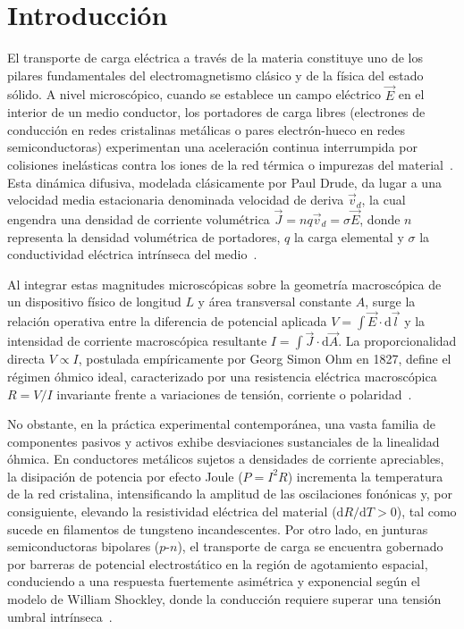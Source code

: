 
\section{Introducción}
\label{sec:introduccion}

El transporte de carga eléctrica a través de la materia constituye uno de los pilares fundamentales del electromagnetismo clásico y de la física del estado sólido. A nivel microscópico, cuando se establece un campo eléctrico $\vec{E}$ en el interior de un medio conductor, los portadores de carga libres (electrones de conducción en redes cristalinas metálicas o pares electrón-hueco en redes semiconductoras) experimentan una aceleración continua interrumpida por colisiones inelásticas contra los iones de la red térmica o impurezas del material~\cite{serway, halliday}. Esta dinámica difusiva, modelada clásicamente por Paul Drude, da lugar a una velocidad media estacionaria denominada velocidad de deriva $\vec{v}_d$, la cual engendra una densidad de corriente volumétrica $\vec{J} = n q \vec{v}_d = \sigma \vec{E}$, donde $n$ representa la densidad volumétrica de portadores, $q$ la carga elemental y $\sigma$ la conductividad eléctrica intrínseca del medio~\cite{sears}.

Al integrar estas magnitudes microscópicas sobre la geometría macroscópica de un dispositivo físico de longitud $L$ y área transversal constante $A$, surge la relación operativa entre la diferencia de potencial aplicada $V = \int \vec{E}\cdot\mathrm{d}\vec{l}$ y la intensidad de corriente macroscópica resultante $I = \int \vec{J}\cdot\mathrm{d}\vec{A}$. La proporcionalidad directa $V \propto I$, postulada empíricamente por Georg Simon Ohm en 1827, define el régimen óhmico ideal, caracterizado por una resistencia eléctrica macroscópica $R = V/I$ invariante frente a variaciones de tensión, corriente o polaridad~\cite{guia_lab_uni, serway}.

No obstante, en la práctica experimental contemporánea, una vasta familia de componentes pasivos y activos exhibe desviaciones sustanciales de la linealidad óhmica. En conductores metálicos sujetos a densidades de corriente apreciables, la disipación de potencia por efecto Joule ($P = I^2 R$) incrementa la temperatura de la red cristalina, intensificando la amplitud de las oscilaciones fonónicas y, por consiguiente, elevando la resistividad eléctrica del material ($\mathrm{d}R/\mathrm{d}T > 0$), tal como sucede en filamentos de tungsteno incandescentes. Por otro lado, en junturas semiconductoras bipolares ($p$-$n$), el transporte de carga se encuentra gobernado por barreras de potencial electrostático en la región de agotamiento espacial, conduciendo a una respuesta fuertemente asimétrica y exponencial según el modelo de William Shockley, donde la conducción requiere superar una tensión umbral intrínseca~\cite{boylestad}.

